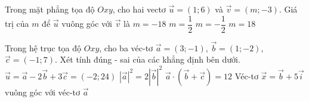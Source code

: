 

\begin{ex}%
	Trong mặt phẳng tọa độ $Oxy$, cho hai vectơ $\overrightarrow{u}=\left(1;6\right)$ và $\overrightarrow{v}=\left(m;-3\right)$. Giá  trị của $m$ để $\overrightarrow{u}$ vuông góc với $\overrightarrow{v}$ là
	\choice 
		{$m=-18$} 
		{$m=\dfrac{1}{2}$} 
		{$m=-\dfrac{1}{2}$} 
		 {\True $m=18$}
\end{ex}


\begin{ex}%
	Trong hệ trục tọa độ $Oxy$, cho ba véc-tơ $\overrightarrow{a}=(3;-1)$, $\overrightarrow{b}=(1;-2)$,  $\overrightarrow{c}=(-1;7)$. Xét tính đúng - sai của các khẳng định bên dưới.
	 \choiceTF
		 {\True $\overrightarrow{u}=\overrightarrow{a}-2\overrightarrow{b}+3\overrightarrow{c}=(-2;24)$}
		{\True $\left|\overrightarrow{a}\right|^2=2\left|\overrightarrow{b}\right|^2$} 
		 {$\overrightarrow{a}\cdot\left(\overrightarrow{b}+\overrightarrow{c}\right)=12$}
		{\True Véc-tơ $\overrightarrow{x}=\overrightarrow{b}+5\overrightarrow{i}$  vuông góc với véc-tơ $\overrightarrow{a}$}
\end{ex}

